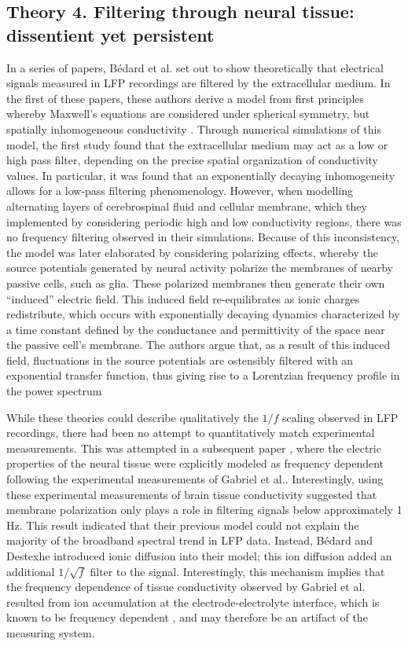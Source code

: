 \subsection{Theory 4. Filtering through neural tissue: dissentient yet persistent} \label{sec:filter_theory}
In a series of papers, Bédard et al.\cite{Bedard2004,Bedard2006a,Bedard2009} set out to show theoretically that electrical signals measured in LFP recordings are filtered by the extracellular medium. In the first of these papers, these authors derive a model from first principles whereby Maxwell’s equations are considered under spherical symmetry, but spatially inhomogeneous conductivity \cite{Bedard2004}. Through numerical simulations of this model, the first study found that the extracellular medium may act as a low or high pass filter, depending on the precise spatial organization of conductivity values. In particular, it was found that an exponentially decaying inhomogeneity allows for a low-pass filtering phenomenology. However, when modelling alternating layers of cerebrospinal fluid and cellular membrane, which they implemented by considering periodic high and low conductivity regions, there was no frequency filtering observed in their simulations. Because of this inconsistency, the model was later elaborated \cite{Bedard2006a} by considering polarizing effects, whereby the source potentials generated by neural activity polarize the membranes of nearby passive cells, such as glia. These polarized membranes then generate their own ``induced'' electric field. This induced field re-equilibrates as ionic charges redistribute, which occurs with exponentially decaying dynamics characterized by a time constant defined by the conductance and permittivity of the space near the passive cell's membrane. The authors argue that, as a result of this induced field, fluctuations in the source potentials are ostensibly filtered with an exponential transfer function, thus giving rise to a Lorentzian frequency profile in the power spectrum

While these theories could describe qualitatively the $1/f$ scaling observed in LFP recordings, there had been no attempt to quantitatively match experimental measurements. This was attempted in a subsequent paper \cite{Bedard2009}, where the electric properties of the neural tissue were explicitly modeled as frequency dependent following the experimental measurements of Gabriel et al.\cite{Gabriel1996}. Interestingly, using these experimental measurements of brain tissue conductivity suggested that membrane polarization only plays a role in filtering signals below approximately 1 Hz. This result indicated that their previous model \cite{Bedard2006a} could not explain the majority of the broadband spectral trend in LFP data. Instead, Bédard and Destexhe\cite{Bedard2006a} introduced ionic diffusion into their model; this ion diffusion added an additional $1/\sqrt{f}$ filter to the signal. Interestingly, this mechanism implies that the frequency dependence of tissue conductivity observed by Gabriel et al.\cite{Gabriel1996} resulted from ion accumulation at the electrode-electrolyte interface, which is known to be frequency dependent \cite{Warburg1899}, and may therefore be an artifact of the measuring system.


